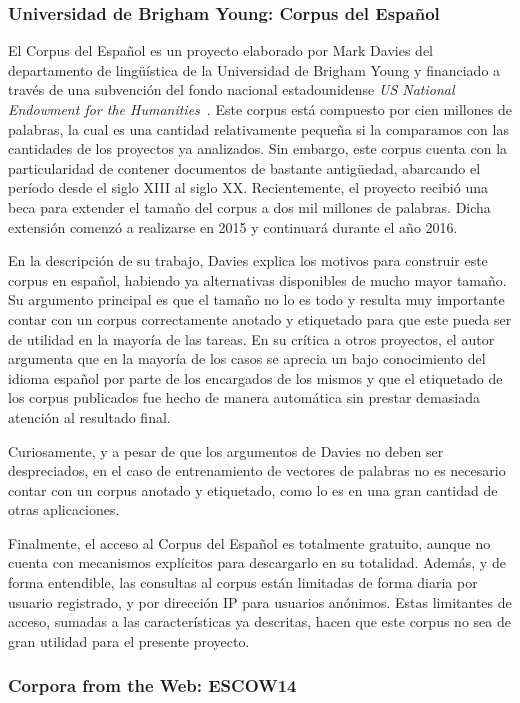 \subsubsection{Universidad de Brigham Young: Corpus del Español}

El Corpus del Español es un proyecto elaborado por Mark Davies del departamento de lingüística de
la Universidad de Brigham Young y financiado a través de una subvención del fondo nacional
estadounidense \textit{US National Endowment for the Humanities}~\cite{CorpusDelEsp}. Este corpus está
compuesto por cien millones de palabras, la cual es una cantidad relativamente pequeña si la comparamos
con las cantidades de los proyectos ya analizados. Sin embargo,  este corpus cuenta con la particularidad
de contener documentos de bastante antigüedad, abarcando el período desde el siglo XIII al siglo XX.
Recientemente, el proyecto recibió una beca para extender el tamaño del corpus a dos mil millones de
palabras. Dicha extensión comenzó a realizarse en 2015 y continuará durante el año 2016.

En la descripción de su trabajo, Davies explica los motivos para construir este corpus en español,
habiendo ya alternativas disponibles de mucho mayor tamaño. Su argumento principal es que el tamaño
no lo es todo y resulta muy importante contar con un corpus correctamente anotado y etiquetado para
que este pueda ser de utilidad en la mayoría de las tareas. En su crítica a otros proyectos, el autor
argumenta que en la mayoría de los casos se aprecia un bajo conocimiento del idioma español por parte
de los encargados de los mismos y que el etiquetado de los corpus publicados fue hecho de manera
automática sin prestar demasiada atención al resultado final.

Curiosamente, y a pesar de que los argumentos de Davies no deben ser despreciados, en el caso de
entrenamiento de vectores de palabras no es necesario contar con un corpus anotado y etiquetado, como
lo es en una gran cantidad de otras aplicaciones.

Finalmente, el acceso al Corpus del Español es totalmente gratuito, aunque no cuenta con mecanismos
explícitos para descargarlo en su totalidad. Además, y de forma entendible, las consultas al corpus
están limitadas de forma diaria por usuario registrado, y por dirección IP para usuarios anónimos.
Estas limitantes de acceso, sumadas a las características ya descritas, hacen que este corpus no sea
de gran utilidad para el presente proyecto.

\subsubsection{Corpora from the Web: ESCOW14}

